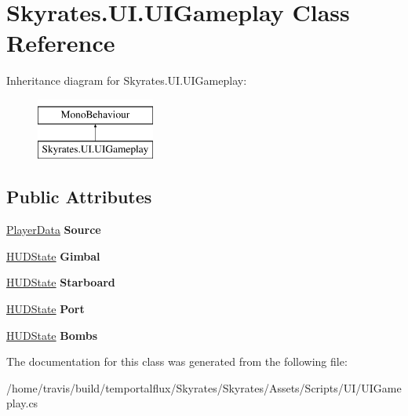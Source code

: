 \hypertarget{class_skyrates_1_1_u_i_1_1_u_i_gameplay}{\section{Skyrates.\-U\-I.\-U\-I\-Gameplay Class Reference}
\label{class_skyrates_1_1_u_i_1_1_u_i_gameplay}
}
Inheritance diagram for Skyrates.\-U\-I.\-U\-I\-Gameplay\-:\begin{figure}[H]
\begin{center}
\leavevmode
\includegraphics[height=2.000000cm]{class_skyrates_1_1_u_i_1_1_u_i_gameplay}
\end{center}
\end{figure}
\subsection*{Public Attributes}
\begin{DoxyCompactItemize}
\item 
\hypertarget{class_skyrates_1_1_u_i_1_1_u_i_gameplay_a4770e7e5a4ebc0922769fa4f42c1c565}{\hyperlink{class_skyrates_1_1_data_1_1_player_data}{Player\-Data} {\bfseries Source}}\label{class_skyrates_1_1_u_i_1_1_u_i_gameplay_a4770e7e5a4ebc0922769fa4f42c1c565}

\item 
\hypertarget{class_skyrates_1_1_u_i_1_1_u_i_gameplay_a64d8ec206482c71b2fac5910a728b7f7}{\hyperlink{class_skyrates_1_1_u_i_1_1_h_u_d_state}{H\-U\-D\-State} {\bfseries Gimbal}}\label{class_skyrates_1_1_u_i_1_1_u_i_gameplay_a64d8ec206482c71b2fac5910a728b7f7}

\item 
\hypertarget{class_skyrates_1_1_u_i_1_1_u_i_gameplay_a97c05b9c0862fa97ec9bd65e1c141b3e}{\hyperlink{class_skyrates_1_1_u_i_1_1_h_u_d_state}{H\-U\-D\-State} {\bfseries Starboard}}\label{class_skyrates_1_1_u_i_1_1_u_i_gameplay_a97c05b9c0862fa97ec9bd65e1c141b3e}

\item 
\hypertarget{class_skyrates_1_1_u_i_1_1_u_i_gameplay_a5b0838b0fe0e6251cb39caffbdf64746}{\hyperlink{class_skyrates_1_1_u_i_1_1_h_u_d_state}{H\-U\-D\-State} {\bfseries Port}}\label{class_skyrates_1_1_u_i_1_1_u_i_gameplay_a5b0838b0fe0e6251cb39caffbdf64746}

\item 
\hypertarget{class_skyrates_1_1_u_i_1_1_u_i_gameplay_ab816e5439f127df67f43ecb673cd06ca}{\hyperlink{class_skyrates_1_1_u_i_1_1_h_u_d_state}{H\-U\-D\-State} {\bfseries Bombs}}\label{class_skyrates_1_1_u_i_1_1_u_i_gameplay_ab816e5439f127df67f43ecb673cd06ca}

\end{DoxyCompactItemize}


The documentation for this class was generated from the following file\-:\begin{DoxyCompactItemize}
\item 
/home/travis/build/temportalflux/\-Skyrates/\-Skyrates/\-Assets/\-Scripts/\-U\-I/U\-I\-Gameplay.\-cs\end{DoxyCompactItemize}
